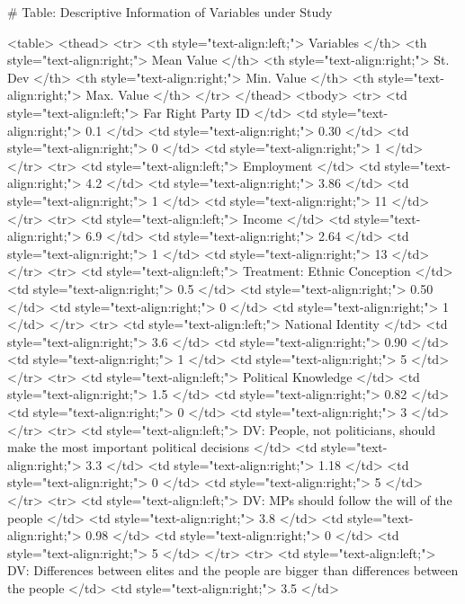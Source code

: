 # Table: Descriptive Information of Variables under Study 

<table>
 <thead>
  <tr>
   <th style="text-align:left;"> Variables </th>
   <th style="text-align:right;"> Mean Value </th>
   <th style="text-align:right;"> St. Dev </th>
   <th style="text-align:right;"> Min. Value </th>
   <th style="text-align:right;"> Max. Value </th>
  </tr>
 </thead>
<tbody>
  <tr>
   <td style="text-align:left;"> Far Right Party ID </td>
   <td style="text-align:right;"> 0.1 </td>
   <td style="text-align:right;"> 0.30 </td>
   <td style="text-align:right;"> 0 </td>
   <td style="text-align:right;"> 1 </td>
  </tr>
  <tr>
   <td style="text-align:left;"> Employment </td>
   <td style="text-align:right;"> 4.2 </td>
   <td style="text-align:right;"> 3.86 </td>
   <td style="text-align:right;"> 1 </td>
   <td style="text-align:right;"> 11 </td>
  </tr>
  <tr>
   <td style="text-align:left;"> Income </td>
   <td style="text-align:right;"> 6.9 </td>
   <td style="text-align:right;"> 2.64 </td>
   <td style="text-align:right;"> 1 </td>
   <td style="text-align:right;"> 13 </td>
  </tr>
  <tr>
   <td style="text-align:left;"> Treatment: Ethnic Conception </td>
   <td style="text-align:right;"> 0.5 </td>
   <td style="text-align:right;"> 0.50 </td>
   <td style="text-align:right;"> 0 </td>
   <td style="text-align:right;"> 1 </td>
  </tr>
  <tr>
   <td style="text-align:left;"> National Identity </td>
   <td style="text-align:right;"> 3.6 </td>
   <td style="text-align:right;"> 0.90 </td>
   <td style="text-align:right;"> 1 </td>
   <td style="text-align:right;"> 5 </td>
  </tr>
  <tr>
   <td style="text-align:left;"> Political Knowledge </td>
   <td style="text-align:right;"> 1.5 </td>
   <td style="text-align:right;"> 0.82 </td>
   <td style="text-align:right;"> 0 </td>
   <td style="text-align:right;"> 3 </td>
  </tr>
  <tr>
   <td style="text-align:left;"> DV: People, not politicians, 
 should make the most 
 important political decisions </td>
   <td style="text-align:right;"> 3.3 </td>
   <td style="text-align:right;"> 1.18 </td>
   <td style="text-align:right;"> 0 </td>
   <td style="text-align:right;"> 5 </td>
  </tr>
  <tr>
   <td style="text-align:left;"> DV: MPs should follow 
 the will of the people </td>
   <td style="text-align:right;"> 3.8 </td>
   <td style="text-align:right;"> 0.98 </td>
   <td style="text-align:right;"> 0 </td>
   <td style="text-align:right;"> 5 </td>
  </tr>
  <tr>
   <td style="text-align:left;"> DV: Differences between elites and 
 the people are bigger than 
 differences between the people </td>
   <td style="text-align:right;"> 3.5 </td>
